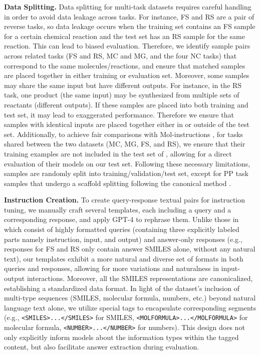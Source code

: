 \noindent \textbf{Data Splitting.}
Data splitting for multi-task datasets requires careful handling in order to avoid data leakage across tasks. For instance, FS and RS are a pair of reverse tasks, so data leakage occurs when the training set contains an FS sample for a certain chemical reaction and the test set has an RS sample for the same reaction. This can lead to biased evaluation. Therefore, we identify sample pairs across related tasks
(FS and RS, MC and MG, and the four NC tasks) that correspond to the same molecules/reactions, and ensure that matched samples are placed together in either training or evaluation set. 
Moreover, some samples may share the same input but have different outputs. For instance, in the RS task, one product (the same input) may be synthesized from multiple sets of reactants (different outputs). If these samples are placed into both training and test set, it may lead to exaggerated performance. 
Therefore we ensure that samples with identical inputs are placed together either in or outside of the test set. 
Additionally, to achieve fair comparisons with Mol-instructions \citep{fang2023mol}, for tasks shared between the two datasets (MC, MG, FS, and RS), we ensure that their training examples are not included in the test set of \datasetname, allowing for a direct evaluation of their models on our test set.
Following these necessary limitations, samples are randomly split into training/validation/test set, except for PP task samples that undergo a scaffold splitting following the canonical method \citep{wu2018moleculenet}.

\noindent\textbf{Instruction Creation.}
To create query-response textual pairs for instruction tuning, we manually craft several templates, each including a query and a corresponding response, and apply GPT-4 to rephrase them. 
Unlike those in \citep{fang2023mol} which consist of highly formatted queries (containing three explicitly labeled parts namely instruction, input, and output) and answer-only responses (e.g., responses for FS and RS only contain answer SMILES alone, without any natural text), our templates exhibit a more natural and diverse set of formats in both queries and responses, allowing for more variations and naturalness in input-output interactions.
Moreover, all the {SMILES} representations are canonicalized, establishing a standardized data format. 
In light of the dataset's inclusion of multi-type sequences (SMILES, molecular formula, numbers, etc.) beyond natural language text alone, we utilize special tags to encapsulate corresponding segments (e.g., \texttt{<SMILES>...</SMILES>} for SMILES, \texttt{<MOLFORMULA>...</MOLFORMULA>} for molecular formula, \texttt{<NUMBER>...</NUMBER>} for numbers). This design does not only explicitly inform models about the information types within the tagged content, but also facilitate answer extraction during evaluation.

